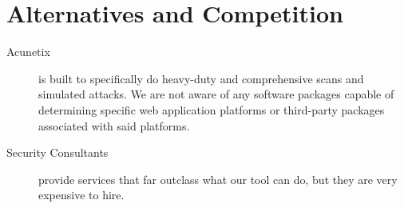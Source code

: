 \section{Alternatives and Competition}
\begin{description}
    \item[Acunetix] is built to specifically do heavy-duty and comprehensive scans and simulated attacks. We are not aware of any software packages capable of determining specific web application platforms or third-party packages associated with said platforms.

    \item[Security Consultants] provide services that far outclass what our tool can do, but they are very expensive to hire.
    \end{description}
